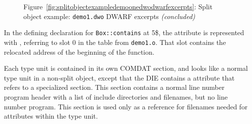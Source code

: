 \begin{figure}
\begin{center}
\vspace{3mm}
Figure~\ref{fig:splitobjectexampledemoonedwodwarfexcerpts}: Split object example: \texttt{demo1.dwo} DWARF excerpts \textit{(concluded)}
\end{center}
\end{figure}

In the defining declaration for \texttt{Box::contains} at 5\$, the
\DWATlowpc{} attribute is represented with \DWFORMaddrx,
referring to slot 0 in the \dotdebugaddr{} table from \texttt{demo1.o}.
That slot contains the relocated address of the beginning of the
function.

Each type unit is contained in its own COMDAT \dotdebuginfodwo{}
section, and looks like a normal type unit in a non-split object,
except that the \DWTAGtypeunit{} DIE contains a \DWATstmtlist{}
attribute that refers to a specialized \dotdebuglinedwo{}
section. This
section contains a normal line number
program header with a list of include directories and filenames,
but no line number program. This section is used only as a
reference for filenames needed for \DWATdeclfile{} attributes
within the type unit.

